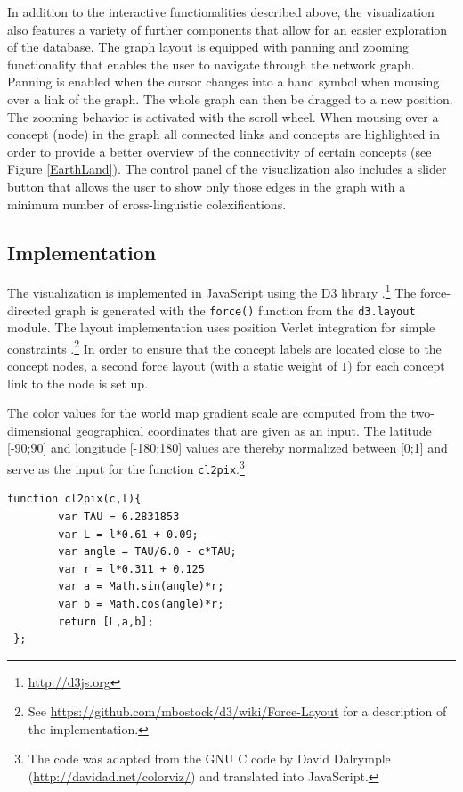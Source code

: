 In addition to the interactive functionalities described above, the visualization also features a variety of further components that allow for an easier exploration of the database. The graph layout is equipped with panning and zooming functionality that enables the user to navigate through the network graph. Panning is enabled when the cursor changes into a hand symbol when mousing over a link of the graph. The whole graph can then be dragged to a new position. The zooming behavior is activated with the scroll wheel. 
When mousing over a concept (node) in the graph all connected links and concepts are highlighted
in order to provide a better overview of the connectivity of certain concepts (see Figure \ref{EarthLand}). The control panel of the visualization also includes a slider button that allows the user to show only those edges in the graph with a minimum number of cross-linguistic colexifications. 




\subsection{Implementation}

The visualization is implemented in JavaScript using the D3 library \cite{D3}.\footnote{\url{http://d3js.org}} The force-directed graph is  generated with the \texttt{force()} function from the \texttt{d3.layout} module. The layout implementation uses position Verlet integration for simple constraints \cite{Dwyer2009}.\footnote{See \url{https://github.com/mbostock/d3/wiki/Force-Layout} for a description of the implementation.} In order to ensure that the concept labels are located close to the concept nodes, a second force layout (with a static weight of $1$) for each concept link to the node is set up. 

The color values for the world map gradient scale are computed from the two-dimensional geographical coordinates that are given as an input. The latitude [-90;90] and longitude [-180;180] values are thereby normalized between [0;1] and serve as the input for the function \texttt{cl2pix}.\footnote{The code was adapted from the GNU C code by David Dalrymple (\url{http://davidad.net/colorviz/}) and translated into JavaScript.}

\begin{verbatim}
function cl2pix(c,l){
   		var TAU = 6.2831853 
   		var L = l*0.61 + 0.09; 
   		var angle = TAU/6.0 - c*TAU;   
   		var r = l*0.311 + 0.125 
   		var a = Math.sin(angle)*r;
   		var b = Math.cos(angle)*r;
   		return [L,a,b];
 };
\end{verbatim}

